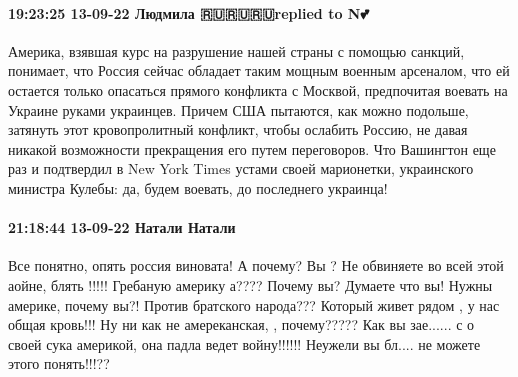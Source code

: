 \paragraph{19:23:25 13-09-22 Людмила 🇷🇺🇷🇺🇷🇺replied to N💕🌹}

Америка, взявшая курс на разрушение нашей страны с помощью санкций, понимает, что Россия сейчас обладает таким мощным военным арсеналом, что ей остается только опасаться прямого конфликта с Москвой, предпочитая воевать на Украине руками украинцев.
Причем США пытаются, как можно подольше, затянуть этот кровопролитный конфликт, чтобы ослабить Россию, не давая никакой возможности прекращения его путем переговоров. Что Вашингтон еще раз и подтвердил в New York Times устами своей марионетки, украинского министра Кулебы: да, будем воевать, до последнего украинца!


\paragraph{21:18:44 13-09-22 Натали Натали}

Все понятно, опять россия виновата! А почему? Вы ? Не обвиняете во всей этой
аойне, блять !!!!! Гребаную америку а???? Почему вы? Думаете что вы! Нужны
америке, почему вы?! Против братского народа??? Который живет рядом , у нас
общая кровь!!! Ну ни как не амереканская, , почему????? Как вы зае...... с о
своей сука америкой, она падла ведет войну!!!!!! Неужели вы бл.... не можете
этого понять!!!??
